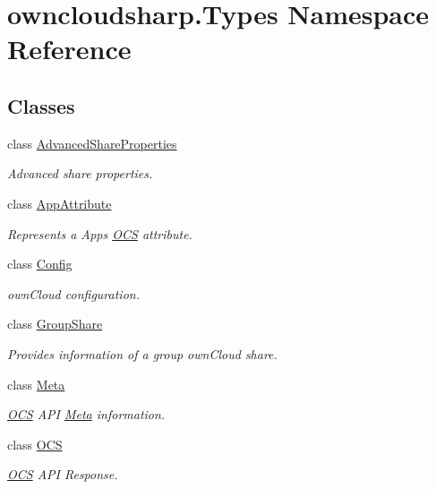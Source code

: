 \hypertarget{namespaceowncloudsharp_1_1_types}{}\section{owncloudsharp.\+Types Namespace Reference}
\label{namespaceowncloudsharp_1_1_types}
\subsection*{Classes}
\begin{DoxyCompactItemize}
\item 
class \hyperlink{classowncloudsharp_1_1_types_1_1_advanced_share_properties}{Advanced\+Share\+Properties}
\begin{DoxyCompactList}\small\item\em Advanced share properties. \end{DoxyCompactList}\item 
class \hyperlink{classowncloudsharp_1_1_types_1_1_app_attribute}{App\+Attribute}
\begin{DoxyCompactList}\small\item\em Represents a Apps \hyperlink{classowncloudsharp_1_1_types_1_1_o_c_s}{O\+C\+S} attribute. \end{DoxyCompactList}\item 
class \hyperlink{classowncloudsharp_1_1_types_1_1_config}{Config}
\begin{DoxyCompactList}\small\item\em own\+Cloud configuration. \end{DoxyCompactList}\item 
class \hyperlink{classowncloudsharp_1_1_types_1_1_group_share}{Group\+Share}
\begin{DoxyCompactList}\small\item\em Provides information of a group own\+Cloud share. \end{DoxyCompactList}\item 
class \hyperlink{classowncloudsharp_1_1_types_1_1_meta}{Meta}
\begin{DoxyCompactList}\small\item\em \hyperlink{classowncloudsharp_1_1_types_1_1_o_c_s}{O\+C\+S} A\+P\+I \hyperlink{classowncloudsharp_1_1_types_1_1_meta}{Meta} information. \end{DoxyCompactList}\item 
class \hyperlink{classowncloudsharp_1_1_types_1_1_o_c_s}{O\+C\+S}
\begin{DoxyCompactList}\small\item\em \hyperlink{classowncloudsharp_1_1_types_1_1_o_c_s}{O\+C\+S} A\+P\+I Response. \end{DoxyCompactList}\item 

\end{DoxyCompactItemize}
